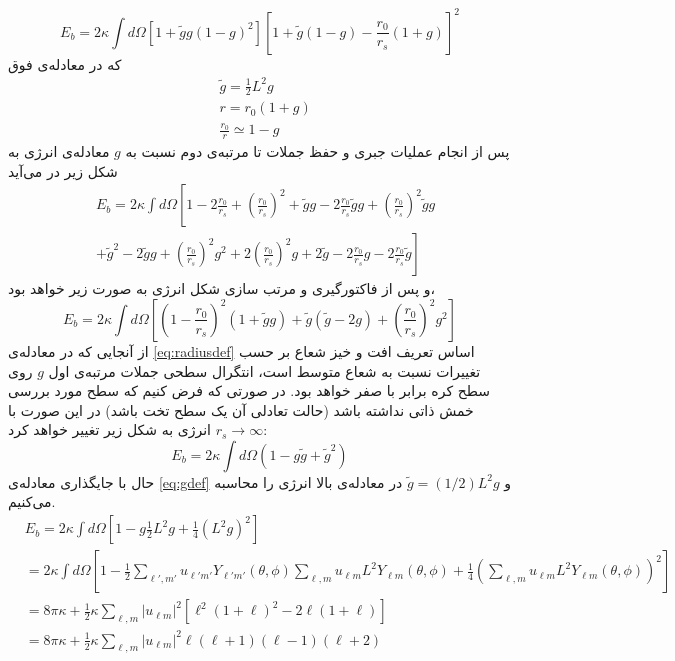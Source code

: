 \begin{equation}
E_b=2\kappa\int d\Omega\left[1+\tilde gg(1-g)^2\right]\left[1+\tilde g(1-g)-\frac{r_0}{r_s}(1+g)\right]^2
\end{equation}
که در معادله‌ی فوق
\begin{equation}
\begin{aligned}
&\tilde{g}=\frac{1}{2}L^2g\\
&r=r_0(1+g)\\
&\frac{r_0}{r}\simeq 1-g
\label{eq:ebsubs}
\end{aligned}
\end{equation}
پس از انجام عملیات جبری و حفظ جملات تا مرتبه‌ی دوم نسبت به $g$
معادله‌ی انرژی به شکل زیر در می‌آید
\begin{equation}
\begin{aligned}
&E_b=2\kappa\int d\Omega\left[1-2\frac{r_0}{r_s}+\left(\frac{r_0}{r_s}\right)^2+\tilde gg -2\frac{r_0}{r_s}\tilde gg+\left(\frac{r_0}{r_s}\right)^2\tilde gg\right.\\
&\left.+\tilde g^2-2\tilde gg +\left(\frac{r_0}{r_s}\right)^2g^2+2\left(\frac{r_0}{r_s}\right)^2g+2\tilde g-2\frac{r_0}{r_s}g-2\frac{r_0}{r_s}\tilde g\right]
\end{aligned}
\end{equation}
و پس از فاکتورگیری و مرتب سازی شکل انرژی به صورت زیر خواهد بود، 
\begin{equation}
E_b=2\kappa\int d\Omega\left[\left(1-\frac{r_0}{r_s}\right)^2(1+\tilde gg)+\tilde g(\tilde g-2g)+\left(\frac{r_0}{r_s}\right)^2g^2\right]
\label{eq:ebfinal}
\end{equation}
از آنجایی که در معادله‌ی
\ref{eq:radiusdef}
اساس تعریف افت و خیز شعاع بر حسب تغییرات نسبت به شعاع متوسط است، انتگرال سطحی جملات مرتبه‌ی اول $g$ روی سطح کره برابر با صفر خواهد بود. در صورتی که فرض کنیم که سطح مورد بررسی خمش ذاتی نداشته باشد (حالت تعادلی آن یک سطح تخت باشد) در این صورت با $r_s\rightarrow\infty$ انرژی به شکل زیر تغییر خواهد کرد:
\begin{equation}
E_b=2\kappa\int d\Omega\left(1-g\tilde g+\tilde g^2\right)
\label{eq:ebfinalnors}
\end{equation}
حال با جایگذاری معادله‌ی
\ref{eq:gdef}
و $\tilde g=(1/2)L^2g$ در معادله‌ی بالا انرژی را محاسبه می‌کنیم.
\begin{equation}
\begin{aligned}
&E_b=2\kappa\int d\Omega\left[1-g\frac{1}{2}L^2g+\frac{1}{4}\left(L^2g\right)^2\right]\\
&=2\kappa\int d\Omega\left[1-\frac{1}{2}\sum_{\ell',m'}u_{\ell' m'}Y_{\ell' m'} (\theta,\phi)\sum_{\ell,m}u_{\ell m}L^2Y_{\ell m} (\theta,\phi)+\frac{1}{4}\left(\sum_{\ell,m}u_{\ell m}L^2Y_{\ell m} (\theta,\phi)\right)^2\right]\\
&=8\pi \kappa+\frac{1}{2}\kappa\sum_{\ell,m}|u_{\ell m}|^2\left[\ell^2(1+\ell)^2-2\ell(1+\ell)\right]\\
&=8\pi\kappa+\frac{1}{2}\kappa\sum_{\ell,m}|u_{\ell m}|^2\ell(\ell+1)(\ell-1)(\ell+2)
\end{aligned}
\end{equation}
